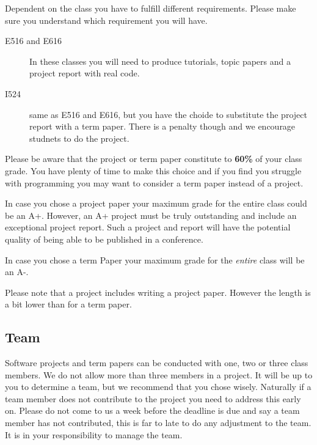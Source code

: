 
Dependent on the class you have to fulfill different
requirements. Please make sure you understand which requirement you
will have.

\begin{description}

\item[E516 and E616] In these classes you will need to produce
  tutorials, topic papers and a project report with real code.

\item[I524] same as E516 and E616, but you have the choide to
  substitute the project report with a term paper. There is a penalty
  though and we encourage studnets to do the project.

\end{description}

Please be aware that the project or term paper constitute to
\textbf{60\%} of your class grade. You have plenty of time to make
this choice and if you find you struggle with programming you may want
to consider a term paper instead of a project.

In case you chose a project paper your maximum grade for the entire class
could be an A+. However, an A+ project must be truly outstanding and
include an exceptional project report. Such a project and report will
have the potential quality of being able to be published in a
conference.

In case you chose a term Paper your maximum grade for the {\em entire} class
will be an A-.

Please note that a project includes writing a project paper.  However
the length is a bit lower than for a term paper.

\subsection{Team}

Software projects and term papers can be conducted with one, two or
three class members. We do not allow more than three members in a
project. It will be up to you to determine a team, but we recommend
that you chose wisely. Naturally if a team member does not contribute
to the project you need to address this early on. Please do not come
to us a week before the deadline is due and say a team member has not
contributed, this is far to late to do any adjustment to the team. It
is in your responsibility to manage the team.

